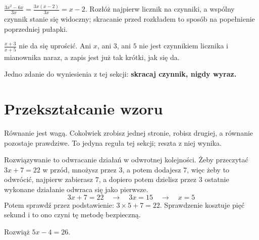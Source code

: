 \begin{fr}
\begin{ansblock}
$\frac{3x^{2} - 6x}{3x} = \frac{3x(x - 2)}{3x} = x - 2$. Rozłóż najpierw
licznik na czynniki, a wspólny czynnik stanie się widoczny; skracanie przed
rozkładem to sposób na popełnienie poprzedniej pułapki.

$\frac{x + 3}{x + 5}$ nie da się uprościć. Ani $x$, ani $3$, ani $5$ nie jest
czynnikiem licznika i mianownika naraz, a zapis jest już tak krótki, jak się
da.
\end{ansblock}

Jedno zdanie do wyniesienia z tej sekcji: \textbf{skracaj czynnik, nigdy
wyraz.}
\end{fr}

\section{Przekształcanie wzoru}
\label{sec:F02-rearranging}

\begin{fr}
Równanie jest wagą. Cokolwiek zrobisz jednej stronie, robisz drugiej, a
równanie pozostaje prawdziwe. To jedyna reguła tej sekcji; reszta z niej
wynika.

Rozwiązywanie to odwracanie działań w odwrotnej kolejności. Żeby przeczytać
$3x + 7 = 22$ w przód, mnożysz przez $3$, a potem dodajesz $7$, więc żeby to
odwrócić, najpierw zabierasz $7$, a dopiero potem dzielisz przez $3$ \dash{}
ostatnie wykonane działanie odwraca się jako pierwsze.
\[ 3x + 7 = 22 \quad\longrightarrow\quad 3x = 15
   \quad\longrightarrow\quad x = 5 \]
Potem sprawdź przez podstawienie: $3 \times 5 + 7 = 22$. Sprawdzenie kosztuje
pięć sekund i to ono czyni tę metodę bezpieczną.

Rozwiąż $5x - 4 = 26$.
\nextframe
\end{fr}

